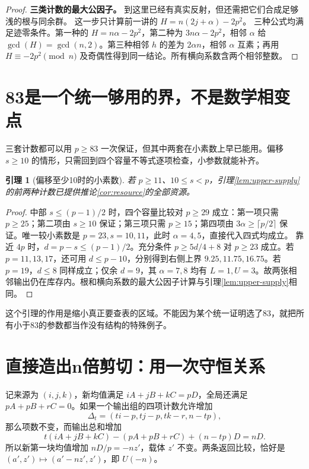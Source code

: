 \documentclass[11pt,a4paper,oneside,openany]{book}
\newtheorem{lemma}[theorem]{引理}
\theoremstyle{definition}
\numberwithin{equation}{chapter}
\begin{document}
\begin{proof}
\par\noindent\textbf{三类计数的最大公因子。}
到这里已经有真实反射，但还需把它们合成足够浅的根与同余群。
这一步只计算前一讲的 $H=n(2j+\alpha)-2p^2$。
三种公式均满足迹零条件。第一种的 $H=n\alpha-2p^2$，第二种为 $3n\alpha-2p^2$，相邻 $\alpha$ 给 $\gcd(H)=\gcd(n,2)$。第三种相邻 $h$ 的差为 $2\alpha n$，相邻 $\alpha$ 互素；再用 $H\equiv-2p^2\pmod n$ 及奇偶性得到同一结论。所有横向系数含两个相邻整数。
\end{proof}

\section{83是一个统一够用的界，不是数学相变点}
三套计数都可以用 $p\ge83$ 一次保证，但其中两套在小素数上早已能用。偏移 $s\ge10$ 的情形，只需回到四个容量不等式逐项检查，小参数就能补齐。
\begin{lemma}[偏移至少10时的小素数]\label{lem:upper-small}
若 $p\ge11$、$10\le s<p$，引理\ref{lem:upper-supply}的前两种计数已提供推论\ref{cor:resource}的全部资源。
\end{lemma}
\begin{proof}
中部 $s\le(p-1)/2$ 时，四个容量比较对 $p\ge29$ 成立：第一项只需 $p\ge25$；第二项由 $s\ge10$ 保证；第三项只需 $p\ge15$；第四项由 $3\alpha\ge\lceil p/2\rceil$ 保证。唯一较小素数是 $p=23,s=10,11$，此时 $\alpha=4,5$，直接代入四式均成立。
靠近 $4p$ 时，$d=p-s\le(p-1)/2$。充分条件 $p\ge5d/4+8$ 对 $p\ge23$ 成立。若 $p=11,13,17$，还可用 $d\le p-10$，分别得到右侧上界 $9.25,11.75,16.75$。若 $p=19$，$d\le8$ 同样成立；仅余 $d=9$，其 $\alpha=7,8$ 均有 $L=1,U=3$。故两张相邻输出仍在库存内。根和横向系数的最大公因子计算与引理\ref{lem:upper-supply}相同。
\end{proof}
这个引理的作用是缩小真正要查表的区域。不能因为某个统一证明选了83，就把所有小于83的参数都当作没有结构的特殊例子。

\section{直接造出n倍剪切：用一次守恒关系}
记来源为 $(i,j,k)$，新均值满足 $iA+jB+kC=pD$，全局还满足 $pA+pB+rC=0$。如果一个输出组的四项计数允许增加
\[\Delta_t=(ti-p, tj-p, tk-r, n-tp),
\]
那么项数不变，而输出总和增加
\[
t(iA+jB+kC)-(pA+pB+rC)+(n-tp)D=nD.
\]
所以新第一块均值增加 $nD/p=-nz'$，载体 $z'$ 不变。两条返回比较，恰好是 $(a',z')\mapsto(a'-nz',z')$，即 $U(-n)$。
\end{document}
